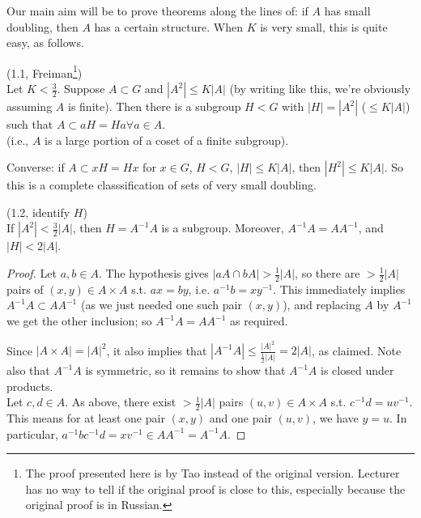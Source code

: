 \documentclass[a4paper]{article}
\begin{document}
Our main aim will be to prove theorems along the lines of: if $A$ has small doubling, then $A$ has a certain structure. When $K$ is very small, this is quite easy, as follows.

\begin{thm} (1.1, Freiman\footnote{The proof presented here is by Tao instead of the original version. Lecturer has no way to tell if the original proof is close to this, especially because the original proof is in Russian.})\\
Let $K< \frac{3}{2}$. Suppose $A \subset G$ and $|A^2| \leq K|A|$ (by writing like this, we're obviously assuming $A$ is finite). Then there is a subgroup $H<G$ with $|H| = |A^2|$ ($\leq K|A|$) such that $A \subset aH = Ha \forall a \in A$.\\
(i.e., $A$ is a large portion of a coset of a finite subgroup).
\end{thm}

\begin{rem}
Converse: if $A \subset xH = Hx$ for $x \in G$, $H<G$, $|H| \leq K|A|$, then $|H^2| \leq K|A|$. So this is a complete classsification of sets of very small doubling.
\end{rem}

\begin{lemma} (1.2, identify $H$)\\
If $|A^2| < \frac{3}{2}|A|$, then $H=A^{-1}A$ is a subgroup. Moreover, $A^{-1}A = AA^{-1}$, and $|H| < 2|A|$.
\begin{proof}
Let $a,b \in A$. The hypothesis gives $|aA \cap bA| > \frac{1}{2} |A|$, so there are $> \frac{1}{2}|A|$ pairs of $(x,y) \in A \times A$ s.t. $ax = by$, i.e. $a^{-1}b=xy^{-1}$. This immediately implies $A^{-1}A \subset AA^{-1}$ (as we just needed one such pair $(x,y)$), and replacing $A$ by $A^{-1}$ we get the other inclusion; so $A^{-1}A = AA^{-1}$ as required.

Since $|A \times A| = |A|^2$, it also implies that $|A^{-1}A| \leq \frac{|A|^2}{\frac{1}{2}|A|} = 2|A|$, as claimed. Note also that $A^{-1}A$ is symmetric, so it remains to show that $A^{-1}A$ is closed under products.\\
Let $c,d \in A$. As above, there exist $>\frac{1}{2}|A|$ pairs $(u,v) \in A \times A$ s.t. $c^{-1} d = uv^{-1}$. This means for at least one pair $(x,y)$ and one pair $(u,v)$, we have $y=u$. In particular, $a^{-1}bc^{-1}d = xv^{-1} \in AA^{-1} = A^{-1}A$.
\end{proof}
\end{lemma}
\end{document}
